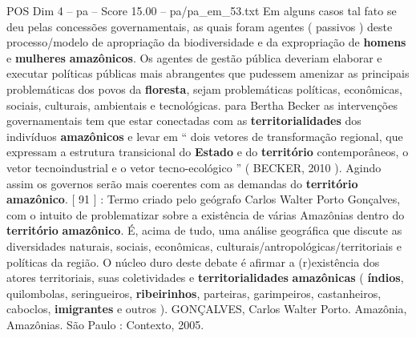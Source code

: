 \begin{textsample}{POS Dim 4 – pa – Score 15.00 – pa/pa\_em\_53.txt}
Em alguns casos tal fato se deu pelas concessões governamentais, as quais foram agentes ( passivos ) deste processo/modelo de apropriação da biodiversidade e da expropriação de \textbf{homens} e \textbf{mulheres} \textbf{amazônicos}.
Os agentes de gestão pública deveriam elaborar e executar políticas públicas mais abrangentes que pudessem amenizar as principais problemáticas dos povos da \textbf{floresta}, sejam problemáticas políticas, econômicas, sociais, culturais, ambientais e tecnológicas. para Bertha Becker as intervenções governamentais tem que estar conectadas com as \textbf{territorialidades} dos indivíduos \textbf{amazônicos} e levar em “ dois vetores de transformação regional, que expressam a estrutura transicional do \textbf{Estado} e do \textbf{território} contemporâneos, o vetor tecnoindustrial e o vetor tecno-ecológico ” ( BECKER, 2010 ).
Agindo assim os governos serão mais coerentes com as demandas do \textbf{território} \textbf{amazônico}. [ 91 ] : Termo criado pelo geógrafo Carlos Walter Porto Gonçalves, com o intuito de problematizar sobre a existência de várias Amazônias dentro do \textbf{território} \textbf{amazônico}.
É, acima de tudo, uma análise geográfica que discute as diversidades naturais, sociais, econômicas, culturais/antropológicas/territoriais e políticas da região.
O núcleo duro deste debate é afirmar a (r)existência dos atores territoriais, suas coletividades e \textbf{territorialidades} \textbf{amazônicas} ( \textbf{índios}, quilombolas, seringueiros, \textbf{ribeirinhos}, parteiras, garimpeiros, castanheiros, caboclos, \textbf{imigrantes} e outros ).
GONÇALVES, Carlos Walter Porto.
Amazônia, Amazônias.
São Paulo : Contexto, 2005.

\end{textsample}
